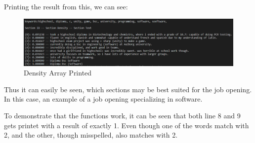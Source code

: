 Printing the result from this, we can see:
\begin{figure}[H]
  \centering
  \includegraphics[scale = 0.6]{figures/density_example.png}
  \caption{Density Array Printed}
\end{figure}
Thus it can easily be seen, which sections may be best suited for the job opening. 
In this case, an example of a job opening specializing in software.

To demonstrate that the functions work, it can be seen that both line 8 and 9 gets printet with a result of exactly 1.
Even though one of the words match with 2, and the other, though misspelled, also matches with 2.

